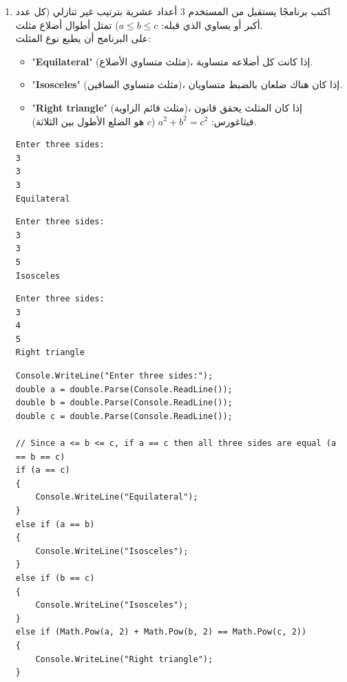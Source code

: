 ﻿\documentclass[14pt]{extarticle}
\begin{document}
\begin{enumerate}[itemsep=3em]
\item
اكتب برنامجًا يستقبل من المستخدم 3 أعداد عشرية بترتيب غير تنازلي (كل عدد أكبر أو يساوي الذي قبله: $a \le b \le c$) تمثل أطوال أضلاع مثلث. \\
على البرنامج أن يطبع نوع المثلث:
\begin{itemize}
    \item "\textbf{\textenglish{Equilateral}}" (مثلث متساوي الأضلاع)، إذا كانت كل أضلاعه متساوية.
    \item "\textbf{\textenglish{Isosceles}}" (مثلث متساوي الساقين)، إذا كان هناك ضلعان بالضبط متساويان.
    \item "\textbf{\textenglish{Right triangle}}" (مثلث قائم الزاوية)، إذا كان المثلث يحقق قانون فيثاغورس: $a^2 + b^2 = c^2$ ($c$ هو الضلع الأطول بين الثلاثة).
\end{itemize}
\ifdetailed
\begin{boxExample}[1]
\begin{english}
\begin{verbatim}
Enter three sides:
3
3
3
Equilateral
\end{verbatim}
\end{english}
\end{boxExample}
\begin{boxExample}[2]
\begin{english}
\begin{verbatim}
Enter three sides:
3
3
5
Isosceles
\end{verbatim}
\end{english}
\end{boxExample}
\begin{boxExample}[3]
\begin{english}
\begin{verbatim}
Enter three sides:
3
4
5
Right triangle
\end{verbatim}
\end{english}
\end{boxExample}
\fi
\ifwithsols
\begin{boxSolution}
\begin{english}
\begin{verbatim}
Console.WriteLine("Enter three sides:");
double a = double.Parse(Console.ReadLine());
double b = double.Parse(Console.ReadLine());
double c = double.Parse(Console.ReadLine());

// Since a <= b <= c, if a == c then all three sides are equal (a == b == c)
if (a == c)
{
    Console.WriteLine("Equilateral");
}
else if (a == b)
{
    Console.WriteLine("Isosceles");
}
else if (b == c)
{
    Console.WriteLine("Isosceles");
}
else if (Math.Pow(a, 2) + Math.Pow(b, 2) == Math.Pow(c, 2))
{
    Console.WriteLine("Right triangle");
}
\end{verbatim}
\end{english}
\end{boxSolution}
\fi
\clearpage


\end{enumerate}
\end{document}
